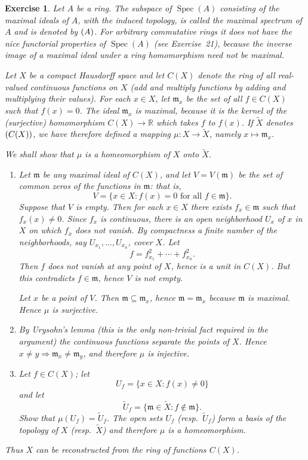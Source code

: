 \documentclass{article}
\theoremstyle{breakstyle}
\newtheorem{exercise}{Exercise}
\let\max\relax
\DeclareMathOperator{\max}{Max}
\DeclareMathOperator{\spec}{Spec}
\begin{document}
\begin{exercise}
Let \(A\) be a ring. The subspace of \(\spec(A)\) consisting of the maximal ideals of \(A\), with the induced topology, is called the maximal spectrum of \(A\) and is denoted by \(\max(A)\). For arbitrary commutative rings it does not have the nice functorial properties of \(\spec(A)\) (see Exercise~21), because the inverse image of a maximal ideal under a ring homomorphism need not be maximal.

Let \(X\) be a compact Hausdorff space and let \(C(X)\) denote the ring of all real-valued continuous functions on \(X\) (add and multiply functions by adding and multiplying their values). For each \(x\in X\), let \(\mathfrak m_x\) be the set of all \(f\in C(X)\) such that \(f(x)=0\). The ideal \(\mathfrak m_x\) is maximal, because it is the kernel of the (surjective) homomorphism \(C(X)\to\mathbb R\) which takes \(f\) to \(f(x)\). If \(\tilde X\) denotes \(\max(C(X))\), we have therefore defined a mapping \(\mu:X\to\tilde X\), namely \(x\mapsto\mathfrak m_x\).

We shall show that \(\mu\) is a homeomorphism of \(X\) onto \(\tilde X\).
\begin{enumerate}[label=(\roman*)]
    \item Let \(\mathfrak m\) be any maximal ideal of \(C(X)\), and let \(V=V(\mathfrak m)\) be the set of common zeros of the functions in \(\mathfrak m\): that is,
    \[
    V=\{x\in X:f(x)=0\text{ for all }f\in\mathfrak m\}.
    \]
    Suppose that \(V\) is empty. Then for each \(x\in X\) there exists \(f_x\in\mathfrak m\) such that \(f_x(x)\neq0\). Since \(f_x\) is continuous, there is an open neighborhood \(U_x\) of \(x\) in \(X\) on which \(f_x\) does not vanish. By compactness a finite number of the neighborhoods, say \(U_{x_1},\ldots,U_{x_n}\), cover \(X\). Let
    \[
    f=f_{x_1}^2+\cdots+f_{x_n}^2.
    \]
    Then \(f\) does not vanish at any point of \(X\), hence is a unit in \(C(X)\). But this contradicts \(f\in\mathfrak m\), hence \(V\) is not empty.

    Let \(x\) be a point of \(V\). Then \(\mathfrak m\subseteq\mathfrak m_x\), hence \(\mathfrak m=\mathfrak m_x\) because \(\mathfrak m\) is maximal. Hence \(\mu\) is surjective.
    \item By Urysohn's lemma (this is the only non-trivial fact required in the argument) the continuous functions separate the points of \(X\). Hence \(x\neq y\Rightarrow\mathfrak m_x\neq\mathfrak m_y\), and therefore \(\mu\) is injective.
    \item Let \(f\in C(X)\); let
    \[
    U_f=\{x\in X:f(x)\neq0\}
    \]
    and let
    \[
    \tilde U_f=\{\mathfrak m\in\tilde X:f\notin\mathfrak m\}.
    \]
    Show that \(\mu(U_f)=\tilde U_f\). The open sets \(U_f\) (resp.\ \(\tilde U_f\)) form a basis of the topology of \(X\) (resp.\ \(\tilde X\)) and therefore \(\mu\) is a homeomorphism.
\end{enumerate}
Thus \(X\) can be reconstructed from the ring of functions \(C(X)\).


\end{exercise}
\end{document}
